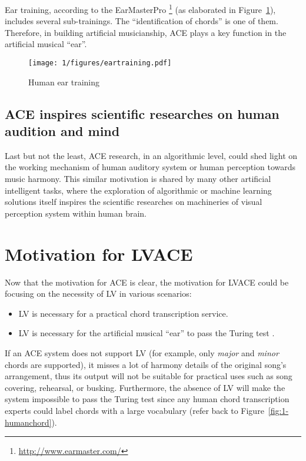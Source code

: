 Ear training, according to the EarMasterPro \footnote{\url{http://www.earmaster.com/}} (as elaborated in Figure~\ref{fig:1-eartraining}), includes several sub-trainings. The ``identification of chords'' is one of them. Therefore, in building artificial musicianship, ACE plays a key function in the artificial musical ``ear''.
\begin{figure}[htb]
\centering
\texttt{[image: 1/figures/eartraining.pdf]}
\caption{Human ear training}
\label{fig:1-eartraining}
\end{figure}

\subsection{ACE inspires scientific researches on human audition and mind}
Last but not the least, ACE research, in an algorithmic level, could shed light on the working mechanism of human auditory system or human perception towards music harmony. This similar motivation is shared by many other artificial intelligent tasks\cite{lecun1995convolutional,hinton1995wake}, where the exploration of algorithmic or machine learning solutions itself inspires the scientific researches on machineries of visual perception system within human brain.

\section{Motivation for LVACE} %
Now that the motivation for ACE is clear, the motivation for LVACE could be focusing on the necessity of LV in various scenarios:
\begin{itemize}
	\item LV is necessary for a practical chord transcription service.
	\item LV is necessary for the artificial musical ``ear'' to pass the Turing test \cite{turing1950computing}.
\end{itemize}
If an ACE system does not support LV (for example, only \textit{major} and \textit{minor} chords are supported), it misses a lot of harmony details of the original song's arrangement, thus its output will not be suitable for practical uses such as song covering, rehearsal, or busking. Furthermore, the absence of LV will make the system impossible to pass the Turing test since any human chord transcription experts could label chords with a large vocabulary (refer back to Figure~\ref{fig:1-humanchord}).

